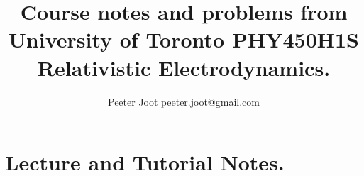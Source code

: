 \documentclass[12pt,leqno]{book}
\begin{document}

\title{Course notes and problems from\\University of Toronto PHY450H1S\\Relativistic Electrodynamics.}
\author{Peeter Joot \quad peeter.joot@gmail.com}

\maketitle

\clearpage{}
\tableofcontents

\clearpage{}

\pagestyle{plain}




\part{Lecture and Tutorial Notes.}


















%
%
















\end{document}
